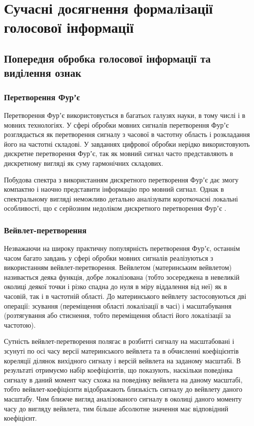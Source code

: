 \section{Сучасні досягнення формалізації голосової інформації} \label{sect1_4}

\subsection{Попередня обробка голосової інформації та виділення ознак}

\subsubsection{Перетворення Фурʼє}

Перетворення Фурʼє використовується в багатьох галузях науки, в тому числі і в мовних технологіях. У сфері обробки мовних сигналів перетворення Фурʼє розглядається як перетворення сигналу з часової в частотну область і розкладання його на частотні складові. У завданнях цифрової обробки нерідко використовують дискретне перетворення Фурʼє, так як мовний сигнал часто представляють в дискретному вигляді як суму гармонічних складових.

Побудова спектра з використанням дискретного перетворення Фурʼє дає змогу компактно і наочно представити інформацію про мовний сигнал. Однак в спектральному вигляді неможливо детально аналізувати короткочасні локальні особливості, що є серйозним недоліком дискретного перетворення Фурʼє \cite{Сергиенко_2002}.

\subsubsection{Вейвлет-перетворення}

Незважаючи на широку практичну популярність перетворення Фурʼє, останнім часом багато завдань у сфері обробки мовних сигналів реалізуються з використанням вейвлет-перетворення. Вейвлетом (материнським вейвлетом) називається деяка функція, добре локалізована (тобто зосереджена в невеликій околиці деякої точки і різко спадна до нуля в міру віддалення від неї) як в часовій, так і в частотній області. До материнського вейвлету застосовуються дві операції: зсування (переміщення області локалізації в часі) і масштабування (розтягування або стиснення, тобто переміщення області його локалізації за частотою).

Сутність вейвлет-перетворення полягає в розбитті сигналу на масштабовані і зсунуті по осі часу версії материнського вейвлета та в обчисленні коефіцієнтів кореляції ділянок вихідного сигналу і версій вейвлета на заданому масштабі. В результаті отримуємо набір коефіцієнтів, що показують, наскільки поведінка сигналу в даний момент часу схожа на поведінку вейвлета на даному масштабі, тобто вейвлет-коефіцієнти відображають близькість сигналу до вейвлету даного масштабу. Чим ближче вигляд аналізованого сигналу в околиці даного моменту часу до вигляду вейвлета, тим більше абсолютне значення має відповідний коефіцієнт.

